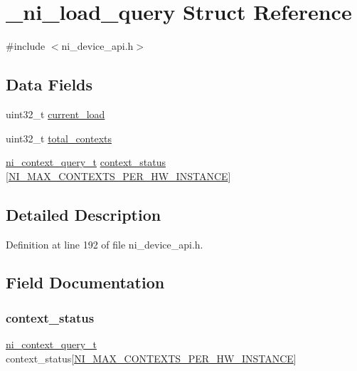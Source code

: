 \hypertarget{struct__ni__load__query}{}\section{\+\_\+ni\+\_\+load\+\_\+query Struct Reference}
\label{struct__ni__load__query}


{\ttfamily \#include $<$ni\+\_\+device\+\_\+api.\+h$>$}

\subsection*{Data Fields}
\begin{DoxyCompactItemize}
\item 
uint32\+\_\+t \mbox{\hyperlink{struct__ni__load__query_aa202e51accad981236be649818f2d8c3}{current\+\_\+load}}
\item 
uint32\+\_\+t \mbox{\hyperlink{struct__ni__load__query_aa6bfe140287adba7005862a782545669}{total\+\_\+contexts}}
\item 
\mbox{\hyperlink{ni__device__api_8h_ab99d6619012182c67c81e65724601553}{ni\+\_\+context\+\_\+query\+\_\+t}} \mbox{\hyperlink{struct__ni__load__query_a509862645541f2af277e823c6bac3274}{context\+\_\+status}} \mbox{[}\mbox{\hyperlink{ni__device__api_8h_a70f86da97e961d53204ce62124fb2090}{N\+I\+\_\+\+M\+A\+X\+\_\+\+C\+O\+N\+T\+E\+X\+T\+S\+\_\+\+P\+E\+R\+\_\+\+H\+W\+\_\+\+I\+N\+S\+T\+A\+N\+CE}}\mbox{]}
\end{DoxyCompactItemize}


\subsection{Detailed Description}


Definition at line 192 of file ni\+\_\+device\+\_\+api.\+h.



\subsection{Field Documentation}
\mbox{\label{struct__ni__load__query_a509862645541f2af277e823c6bac3274}} 
\subsubsection{\texorpdfstring{context\_status}{context\_status}}
{\footnotesize\ttfamily \mbox{\hyperlink{ni__device__api_8h_ab99d6619012182c67c81e65724601553}{ni\+\_\+context\+\_\+query\+\_\+t}} context\+\_\+status\mbox{[}\mbox{\hyperlink{ni__device__api_8h_a70f86da97e961d53204ce62124fb2090}{N\+I\+\_\+\+M\+A\+X\+\_\+\+C\+O\+N\+T\+E\+X\+T\+S\+\_\+\+P\+E\+R\+\_\+\+H\+W\+\_\+\+I\+N\+S\+T\+A\+N\+CE}}\mbox{]}}



